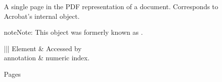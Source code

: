 \documentclass[letterpaper,12pt,english,openany,oneside]{sphinxmanual}
\begin{document}
A single page in the PDF representation of a document. Corresponds to Acrobat’s internal  object.

\begin{sphinxadmonition}{note}{Note:}
This object was formerly known as .
\end{sphinxadmonition}
\label{\detokenize{IAC_API_AppleEvtObjects:elements-3}}


\begin{savenotes}\sphinxattablestart
\centering
{}\label{\detokenize{IAC_API_AppleEvtObjects:section-10}}\nobreak
\begin{tabular}[t]{|||}
\hline
\sphinxstyletheadfamily 
Element
&\sphinxstyletheadfamily 
Accessed by
\\
\hline
annotation
&
numeric index.
\\
\hline
\end{tabular}
\par
\sphinxattableend\end{savenotes}
\label{\detokenize{IAC_API_AppleEvtObjects:plural-form-3}}

Pages

\end{document}
